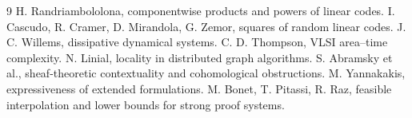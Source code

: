 \documentclass[11pt]{article}
\begin{document}
\begin{thebibliography}{9}
 H. Randriambololona, componentwise products and powers of linear codes.
 I. Cascudo, R. Cramer, D. Mirandola, G. Zemor, squares of random linear codes.
 J. C. Willems, dissipative dynamical systems.
 C. D. Thompson, VLSI area--time complexity.
 N. Linial, locality in distributed graph algorithms.
 S. Abramsky et al., sheaf-theoretic contextuality and cohomological obstructions.
 M. Yannakakis, expressiveness of extended formulations.
 M. Bonet, T. Pitassi, R. Raz, feasible interpolation and lower bounds for strong proof systems.
\end{thebibliography}
\end{document}
